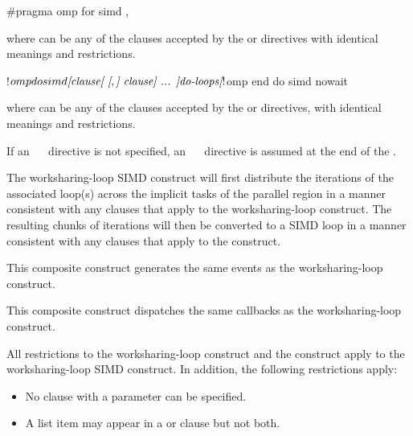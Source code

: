 \begin{samepage}
\syntax
\begin{ccppspecific}
\begin{ompcPragma}
#pragma omp for simd \plc{[clause[ [},\plc{] clause] ... ] new-line}
\end{ompcPragma}

where  can be any of the clauses accepted by the  or 
 directives with identical meanings and restrictions.
\end{ccppspecific}
\end{samepage}

\begin{fortranspecific}
\begin{ompfPragma}
!$omp do simd \plc{[clause[ [},\plc{] clause] ... ]}
   \plc{do-loops}
\plc{[}!$omp end do simd \plc{[}nowait\plc{] ]}
\end{ompfPragma}

where  can be any of the clauses accepted by the  or 
 directives, with identical meanings and restrictions.

If an ~~ directive is not specified, an 
~~ directive is assumed at the end of 
the .
\end{fortranspecific}

\descr
The worksharing-loop SIMD construct will first distribute the iterations 
of the associated loop(s) across the implicit tasks of the parallel region 
in a manner consistent with any clauses that apply to the worksharing-loop
construct. The resulting chunks of iterations will then be converted to a 
SIMD loop in a manner consistent with any clauses that apply to the 
construct.

\events
This composite construct generates the same events as the worksharing-loop construct.

\tools
This composite construct dispatches the same callbacks as the worksharing-loop 
construct.

\restrictions
All restrictions to the worksharing-loop construct and the  construct 
apply to the worksharing-loop SIMD construct. In addition, the following 
restrictions apply:

\begin{itemize}
\item No  clause with a parameter can be specified.
\item A list item may appear in a  or  clause 
      but not both.
\end{itemize}

